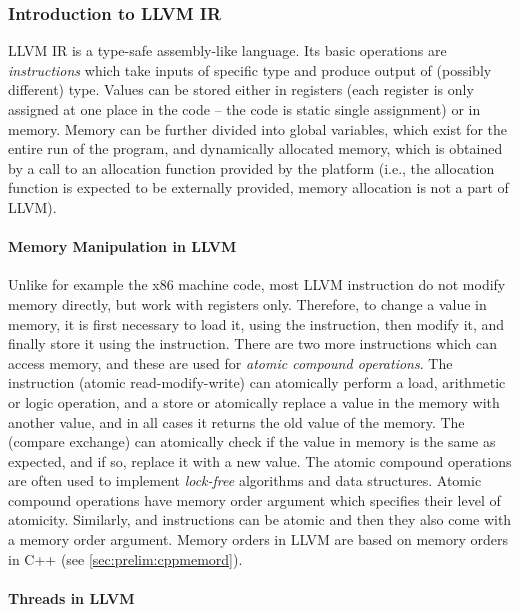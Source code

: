 \subsubsection{Introduction to LLVM IR}

LLVM IR is a type-safe assembly-like language.
Its basic operations are \emph{instructions} which take inputs of specific type
and produce output of (possibly different) type.
Values can be stored either in registers (each register is only assigned at one
place in the code -- the code is static single assignment) or in memory.
Memory can be further divided into global variables, which exist for the entire
run of the program, and dynamically allocated memory, which is obtained by a
call to an allocation function provided by the platform (i.e., the allocation
function is expected to be externally provided, memory allocation is not a part
of LLVM).

\paragraph{Memory Manipulation in LLVM}
Unlike for example the x86 machine code, most LLVM instruction do not modify
memory directly, but work with registers only.
Therefore, to change a value in memory, it is first necessary to load it, using
the  instruction, then modify it, and finally store it using the
 instruction.
There are two more instructions which can access memory, and these are used for
\emph{atomic compound operations}.
The  instruction (atomic read-modify-write) can atomically
perform a load, arithmetic or logic operation, and a store or atomically
replace a value in the memory with another value, and in all cases it returns
the old value of the memory.
The  (compare exchange) can atomically check if the value in memory
is the same as expected, and if so, replace it with a new value.
The atomic compound operations are often used to implement \emph{lock-free}
algorithms and data structures.
Atomic compound operations have memory order argument which specifies their
level of atomicity.
Similarly,  and  instructions can be atomic and then they
also come with a memory order argument.
Memory orders in LLVM are based on memory orders in C++ (see
\autoref{sec:prelim:cppmemord}).

\paragraph{Threads in LLVM}

